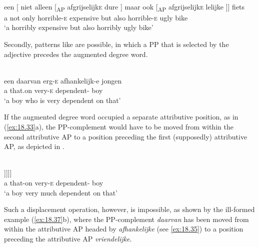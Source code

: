 \documentclass[output=paper]{langsci/langscibook}
\begin{document}
\ea%
    \label{ex:18.34}\\
    \gll een [ niet alleen [\textsubscript{AP} afgrijselijk\textsc{e} dure ] maar ook [\textsubscript{AP} afgrijselijk\textsc{e} lelijke ]] fiets\\
    a {} not only {} horrible-\textsc{e} expensive {} but also {} horrible-\textsc{e} ugly {} bike\\
    \glt ‘a horribly expensive but also horribly ugly bike’
\z

Secondly, patterns like  are possible, in which a PP that is
selected by the adjective precedes the augmented degree word.

\ea%
    \label{ex:18.35}\\
    \gll  een    daarvan  erg-\textsc{e}    afhankelijk-e    jongen\\
         a        that.on      very-\textsc{e}  dependent-\Agr{}    boy\\
    \glt \enquote*{a boy who is very dependent on that}
\z

If the augmented degree word occupied a separate attributive position, as in
(\ref{ex:18.33}a), the PP-complement would have to be moved from within the
second attributive AP to a position preceding the first (supposedly)
attributive AP, as depicted in .

\ea%
    \label{ex:18.36}\\
    \gll  [\textsubscript{DP}  een    [daarvan\textsubscript{i}  [\textsubscript{NP}  erg\textbf{\textsc{-e}}  [\textsubscript{NP}  [t\textsubscript{i}    afhankelijk\textbf{e}]  [\textsubscript{NP}  jongen]]]]]\\
      {}  a              that-on   {}         very-\textsc{e}      {}  {}    dependent-\Agr{}   {}   boy\\
    \glt \enquote*{a boy very much dependent on that}
\z

Such a displacement operation, however, is impossible, as shown by the
ill-formed example (\ref{ex:18.37}b), where the PP-complement \emph{daarvan} has
been moved from within the attributive AP headed by \emph{afhankelijke} (see
\ref{ex:18.35}) to a position preceding the attributive AP
\emph{vriendelijke}.

\ea%
    \label{ex:18.37}
	\z
\z
\end{document}
